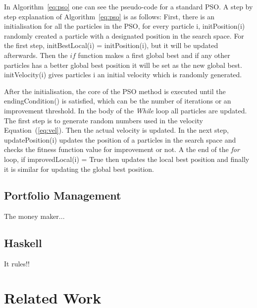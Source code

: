 \documentclass{pdfmx4020}
\begin{document}
    In Algorithm~\ref{eq:pso} one can see the pseudo-code for a standard PSO. A step by step explanation of Algorithm~\ref{eq:pso} is as follows: First, there is an initialisation for all the particles in the PSO, for every particle i, initPosition(i) randomly created a particle with a designated position in the search space. For the first step, initBestLocal(i) = initPosition(i), but it will be updated afterwards. Then the $if$ function makes a first global best and if any other particles has a better global best position it will be set as the new global best. initVelocity(i) gives particles i an initial velocity which is randomly generated. 

    After the initialisation, the core of the PSO method is executed until the endingCondition() is satisfied, which can be the number of iterations or an improvement threshold. In the body of the \textit{While} loop all particles are updated. The first step is to generate random numbers used in the velocity Equation~(\ref{eq:vel}). Then the actual velocity is updated. In the next step, updatePosition(i) updates the position of a particles in the search space and checks the fitness function value for improvement or not. A the end of the \textit{for} loop, if improvedLocal(i) = True then updates the local best position and finally it is similar for updating the global best position. 

    

  \section{Portfolio Management} %
  \label{sec:portfolio_management}
    The money maker...

  \section{Haskell} %
  \label{sec:haskell}
    It rules!! 

    


\chapter{Related Work}
\end{document}
